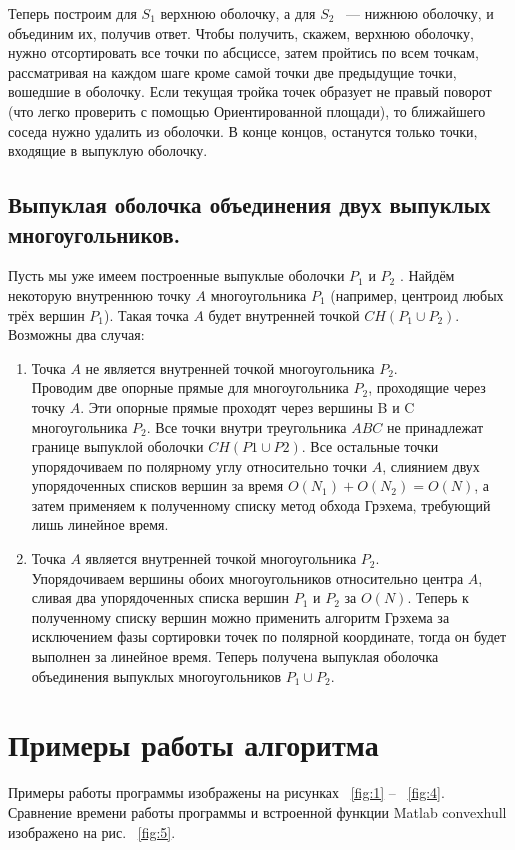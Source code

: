 \documentclass[12pt]{article}
\begin{document}
Теперь построим для $S_1$ верхнюю оболочку, а для $S_2$ ~--- нижнюю оболочку, и объединим их, получив ответ. Чтобы получить, скажем, верхнюю оболочку, нужно отсортировать все точки по абсциссе, затем пройтись по всем точкам, рассматривая на каждом шаге кроме самой точки две предыдущие точки, вошедшие в оболочку. Если текущая тройка точек образует не правый поворот (что легко проверить с помощью Ориентированной площади), то ближайшего соседа нужно удалить из оболочки. В конце концов, останутся только точки, входящие в выпуклую оболочку.

\subsection {Выпуклая оболочка объединения двух выпуклых многоугольников.}
Пусть мы уже имеем построенные выпуклые оболочки  $P_1$  и  $P_2$ .
Найдём некоторую внутреннюю точку  $A$  многоугольника  $P_1$  (например, центроид любых трёх вершин  $P_1$). Такая точка  $A$  будет внутренней точкой  $CH(P_1 \cup P_2)$.
Возможны два случая:
\begin{enumerate}
\item Точка  $A$  не является внутренней точкой многоугольника  $P_2$.\\
Проводим две опорные прямые для многоугольника  $P_2$, проходящие через точку  $A$. Эти опорные прямые проходят через вершины  B  и  C  многоугольника  $P_2$. Все точки внутри треугольника  $ABC$  не принадлежат границе выпуклой оболочки  $CH(P1 \cup P2)$. Все остальные точки упорядочиваем по полярному углу относительно точки  $A$, слиянием двух упорядоченных списков вершин за время  $O(N_1) + O(N_2) = O(N)$, а затем применяем к полученному списку метод обхода Грэхема, требующий лишь линейное время.
\item Точка  $A$  является внутренней точкой многоугольника  $P_2$. \\
Упорядочиваем вершины обоих многоугольников относительно центра  $A$, сливая два упорядоченных списка вершин  $P_1$  и  $P_2$  за  $O(N)$.
Теперь к полученному списку вершин можно применить алгоритм Грэхема за исключением фазы сортировки точек по полярной координате, тогда он будет выполнен за линейное время.
Теперь получена выпуклая оболочка объединения выпуклых многоугольников  $P_1 \cup P_2$.
\end{enumerate}
\section {Примеры работы алгоритма}
Примеры работы программы изображены на рисунках ~\ref{fig:1} -- ~\ref{fig:4}. Сравнение времени работы программы и встроенной функции Matlab convexhull изображено на рис. ~\ref{fig:5}.
\end{document}

